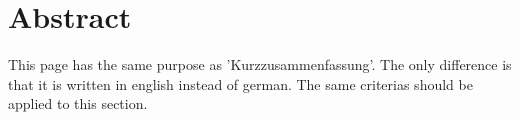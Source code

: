 \section*{Abstract}\label{sec:abstract}


This page has the same purpose as 'Kurzzusammenfassung'. The only difference is that it is written in english instead of german. The same criterias should be applied to this section.

